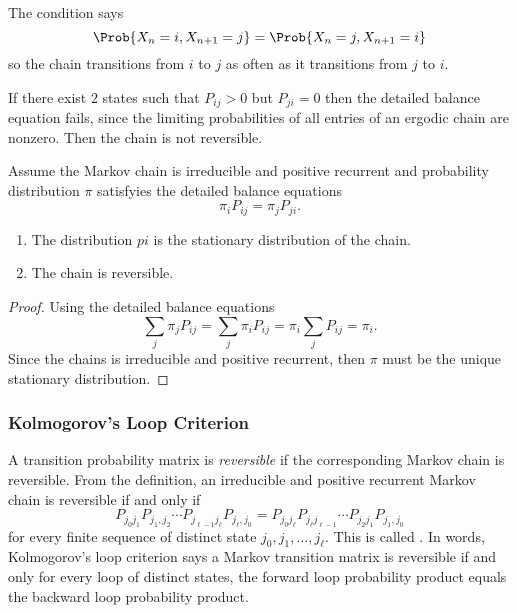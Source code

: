 \documentclass[12pt]{article}
\begin{document}
\begin{remark}
  The condition says
  \[
    \Prob{X_n =i, X_{n+1} = j} = \Prob{X_n =j, X_{n+1} = i}
  \]
  so the chain transitions from $i$ to $j$ as often as it transitions
  from $j$ to $i$.
\end{remark}

\begin{remark}
  If there exist $2$ states such that $P_{ij} > 0$ but $P_{ji} = 0$
  then the detailed balance equation fails, since the limiting probabilities of all
entries of an ergodic chain are nonzero. 
  Then the chain is not reversible.
\end{remark}

\begin{theorem}
  Assume the Markov chain is irreducible and positive recurrent and
  probability distribution $\pi$ satisfyies the detailed balance equations
  \[
    \pi_i P_{ij} = \pi_j P_{ji}.
  \]
  \begin{enumerate}
  \item The distribution $pi$ is the stationary distribution of the chain.
  \item The chain is reversible.
  \end{enumerate}
\end{theorem}

\begin{proof}
  Using the detailed balance equations
  \[
    \sum_j \pi_j P_{ij} = \sum_j \pi_i P_{ij} = \pi_i \sum_j P_{ij} =
    \pi_i.
  \]
  Since the chains is irreducible and positive recurrent, then $\pi$
  must be the unique stationary distribution.
\end{proof}

\subsubsection*{Kolmogorov's Loop Criterion}

A transition probability matrix is
\emph{reversible} if the
corresponding Markov chain is reversible.  From the definition, an
irreducible and positive recurrent Markov chain is reversible if and
only if
\[
  P_{j_0 j_1} P_{j_1,j_2} \cdots P_{j_{\ell-1} j_\ell} P_{j_\ell, j_0} =
  P_{j_0 j_\ell} P_{j_\ell j_{\ell-1}} \cdots P_{j_2 j_1} P_{j_1, j_0}
\]
for every finite sequence of distinct state $j_0, j_1, \dots, j_\ell$.
This is called .
In words, Kolmogorov's loop criterion says a Markov transition matrix is
reversible if and only for every loop of distinct states, the forward loop probability product
equals the backward loop probability product.
\end{document}
